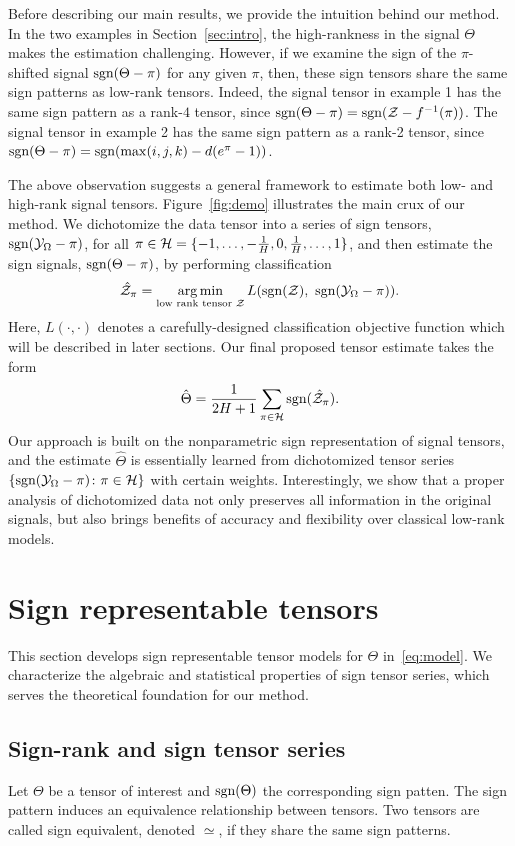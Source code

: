 \documentclass{article}
\theoremstyle{plain}
\theoremstyle{definition}
\def\sign{\textup{sgn}}
\begin{document}
Before describing our main results, we provide the intuition behind our method. In the two examples in Section~\ref{sec:intro}, the high-rankness in the signal $\Theta$ makes the estimation challenging. However, if we examine the sign of the $\pi$-shifted signal $\sign(\Theta-\pi)$ for any given $\pi$, then, these sign tensors share the same sign patterns as low-rank tensors. Indeed, the signal tensor in example 1 has the same sign pattern as a rank-$4$ tensor, since $\sign(\Theta-\pi)=\sign(\tZ-f^{-1}(\pi))$. The signal tensor in example 2 has the same sign pattern as a rank-2 tensor, since $\sign(\Theta-\pi)=\sign(\max(i,j,k)-d(e^{\pi}-1))$.


The above observation suggests a general framework to estimate both low- and high-rank signal tensors. Figure~\ref{fig:demo} illustrates the main crux of our method. We dichotomize the data tensor into a series of sign tensors, $\sign (\tY_\Omega-\pi)$, for all $\pi\in \tH={\{\small-1,\ldots,  -{1\over H},0, {1\over H},\ldots,1\}}$, and then estimate the sign signals, $\sign(\Theta-\pi)$, by performing classification
\[
\hat \tZ_\pi=\argmin_{\text{low rank tensor $\tZ$}} L(\sign(\tZ),\ \sign (\tY_\Omega-\pi)).
\]
Here, $L(\cdot,\cdot)$ denotes a carefully-designed classification objective function which will be described in later sections. Our final proposed tensor estimate takes the form
\[
\hat \Theta = {1\over 2H+1}\sum_{\pi \in \tH} \sign(\hat \tZ_\pi).
\]
Our approach is built on the nonparametric sign representation of signal tensors, and the estimate $\hat \Theta$ is essentially learned from dichotomized tensor series $\{\sign(\tY_\Omega-\pi)\colon \pi \in \tH\}$ with certain weights. Interestingly, we show that a proper analysis of dichotomized data not only preserves all information in the original signals, but also brings benefits of accuracy and flexibility over classical low-rank models. 



\section{Sign representable tensors}\label{sec:representation}
This section develops sign representable tensor models for $\Theta$ in~\eqref{eq:model}. We characterize the algebraic and statistical properties of sign tensor series, which serves the theoretical foundation for our method. 

\subsection{Sign-rank and sign tensor series}\label{sec:sign-rank}
Let $\Theta$ be a tensor of interest and $\sign (\Theta)$ the corresponding sign patten. The sign pattern induces an equivalence relationship between tensors. Two tensors are called sign equivalent, denoted $\simeq$, if they share the same sign patterns. 
\end{document}
